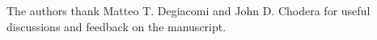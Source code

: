\documentclass[journal=jacsat,manuscript=article]{achemso}
\begin{document}
\begin{acknowledgement}
The authors thank Matteo T. Degiacomi and John D. Chodera for useful discussions and feedback on the manuscript. 
\end{acknowledgement}




\end{document}
